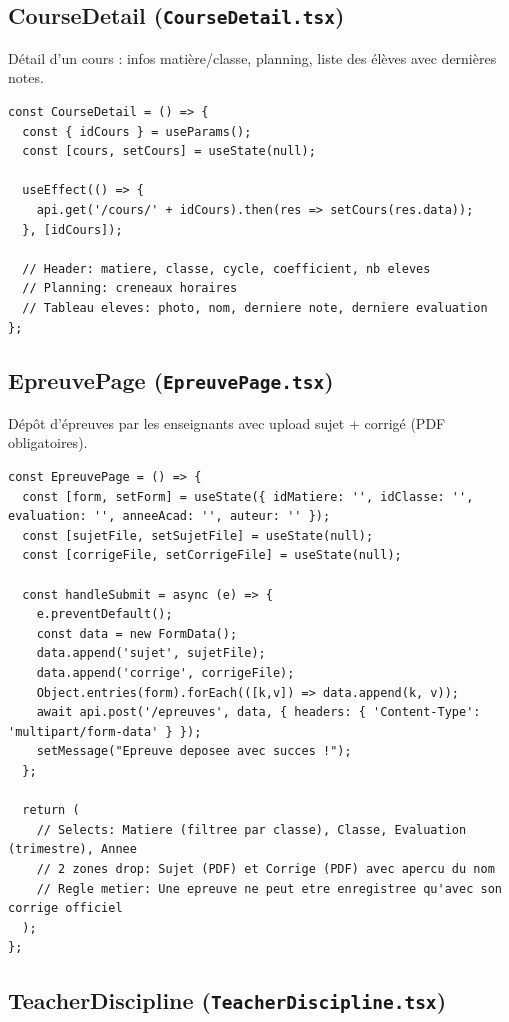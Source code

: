 \documentclass[12pt,a4paper]{article}
\begin{document}
\subsection{CourseDetail (\texttt{CourseDetail.tsx})}

Détail d'un cours : infos matière/classe, planning, liste des élèves avec dernières notes.

\begin{lstlisting}[style=code]
const CourseDetail = () => {
  const { idCours } = useParams();
  const [cours, setCours] = useState(null);

  useEffect(() => {
    api.get('/cours/' + idCours).then(res => setCours(res.data));
  }, [idCours]);

  // Header: matiere, classe, cycle, coefficient, nb eleves
  // Planning: creneaux horaires
  // Tableau eleves: photo, nom, derniere note, derniere evaluation
};
\end{lstlisting}

\subsection{EpreuvePage (\texttt{EpreuvePage.tsx})}

Dépôt d'épreuves par les enseignants avec upload sujet + corrigé (PDF obligatoires).

\begin{lstlisting}[style=code]
const EpreuvePage = () => {
  const [form, setForm] = useState({ idMatiere: '', idClasse: '', evaluation: '', anneeAcad: '', auteur: '' });
  const [sujetFile, setSujetFile] = useState(null);
  const [corrigeFile, setCorrigeFile] = useState(null);

  const handleSubmit = async (e) => {
    e.preventDefault();
    const data = new FormData();
    data.append('sujet', sujetFile);
    data.append('corrige', corrigeFile);
    Object.entries(form).forEach(([k,v]) => data.append(k, v));
    await api.post('/epreuves', data, { headers: { 'Content-Type': 'multipart/form-data' } });
    setMessage("Epreuve deposee avec succes !");
  };

  return (
    // Selects: Matiere (filtree par classe), Classe, Evaluation (trimestre), Annee
    // 2 zones drop: Sujet (PDF) et Corrige (PDF) avec apercu du nom
    // Regle metier: Une epreuve ne peut etre enregistree qu'avec son corrige officiel
  );
};
\end{lstlisting}

\subsection{TeacherDiscipline (\texttt{TeacherDiscipline.tsx})}
\end{document}
